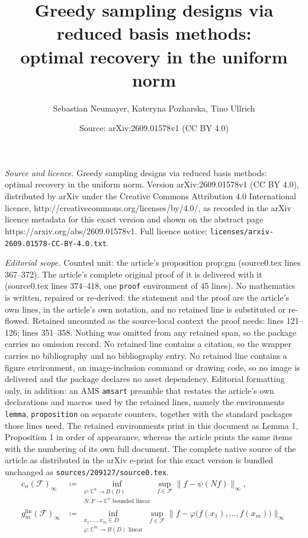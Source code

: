 \documentclass[10pt,a4paper]{amsart}
\title{Greedy sampling designs via reduced basis methods:\\optimal recovery in the uniform norm}
\author{Sebastian Neumayer, Kateryna Pozharska, Tino Ullrich}
\date{Source: arXiv:2609.01578v1 (CC BY 4.0)}
\newcommand{\C}{\mathbb{C}}
\newcommand{\lin}{\ensuremath{\mathrm{lin}}}
\newcommand{\norm}[1]{\lVert #1\rVert}
\begin{document}
\maketitle

\noindent\emph{Source and licence.} Greedy sampling designs via reduced basis methods:\\optimal recovery in the uniform norm. Version arXiv:2609.01578v1 (CC BY 4.0), distributed by arXiv under the Creative Commons Attribution 4.0 International licence, http://creativecommons.org/licenses/by/4.0/, as recorded in the arXiv licence metadata for this exact version and shown on the abstract page https://arxiv.org/abs/2609.01578v1. Full licence notice: \texttt{licenses/arxiv-2609.01578-CC-BY-4.0.txt}.\par\smallskip

\noindent\textit{Editorial scope.} Counted unit: the article's proposition prop:gm (source0.tex lines 367--372). The article's complete original proof of it is delivered with it (source0.tex lines 374--418, one \texttt{proof} environment of 45 lines). No mathematics is written, repaired or re-derived: the statement and the proof are the article's own lines, in the article's own notation, and no retained line is substituted or re-flowed.  Retained uncounted as the source-local context the proof needs: lines 121--126; lines 351--358.  Nothing was omitted from any retained span, so the package carries no omission record.  No retained line contains a citation, so the wrapper carries no bibliography and no bibliography entry.  No retained line contains a figure environment, an image-inclusion command or drawing code, so no image is delivered and the package declares no asset dependency.  Editorial formatting only, in addition: an AMS \texttt{amsart} preamble that restates the article's own declarations and macros used by the retained lines, namely the environments \texttt{lemma}, \texttt{proposition} on separate counters, together with the standard packages those lines need.  The retained environments print in this document as Lemma 1, Proposition 1 in order of appearance, whereas the article prints the same items with the numbering of its own full document.  The complete native source of the article as distributed in the arXiv e-print for this exact version is bundled unchanged as \texttt{sources/209127/source0.tex}.
\begin{align}
c_n(\mathcal{F})_\infty &\coloneqq \inf_{\substack{\psi\colon\C^n\to B(D)\\ N\colon F \to \C^n \text{ bounded linear}}}
\sup_{f\in \mathcal{F}}\norm{f-\psi(Nf)}_\infty,\\
g_m^{\lin}(\mathcal{F})_\infty &\coloneqq \inf_{\substack{x_1,\dots,x_m\in D\\ \varphi\colon \C^m\to B(D) \text{ linear}}}
\sup_{f\in \mathcal{F}} \bigl\| f-\varphi\bigl(f(x_1),\ldots,f(x_m)\bigr)\bigr\|_\infty \label{eq:glin}
\end{align}
\end{document}
